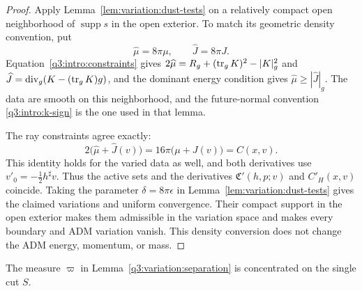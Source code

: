 \begin{proof}
Apply Lemma~\ref{lem:variation:dust-tests} on a relatively compact open
neighborhood of $\operatorname{supp}s$ in the open exterior. To match its
geometric density convention, put
\[
 \widehat\mu=8\pi\mu,\qquad \widehat J=8\pi J.
\]
Equation~\eqref{q3:intro:constraints} gives
$2\widehat\mu=R_g+(\operatorname{tr}_gK)^2-|K|_g^2$ and
$\widehat J=\operatorname{div}_g(K-(\operatorname{tr}_gK)g)$, and the dominant energy condition gives
$\widehat\mu\ge|\widehat J|_g$. The data are smooth on this neighborhood,
and the future-normal convention \eqref{q3:intro:k-sign} is the one used
in that lemma.

The ray constraints agree exactly:
\[
 2\bigl(\widehat\mu+\widehat J(v)\bigr)
      =16\pi\bigl(\mu+J(v)\bigr)=C(x,v).
\]
This identity holds for the varied data as well, and both derivatives
use $v'_0=-\tfrac12h^\sharp v$. Thus the active sets and the derivatives
$\mathfrak C'(h,p;v)$ and $C'_H(x,v)$ coincide. Taking the parameter
$\delta=8\pi\epsilon$ in Lemma~\ref{lem:variation:dust-tests} gives the
claimed variations and uniform convergence. Their compact support in
the open exterior makes them admissible in the variation space and
makes every boundary and ADM variation vanish. This density conversion
does not change the ADM energy, momentum, or mass.
\end{proof}

\begin{lemma}
\label{q3:variation:area-support}
The measure $\varpi$ in Lemma~\ref{q3:variation:separation} is
concentrated on the single cut $S$.
\end{lemma}

